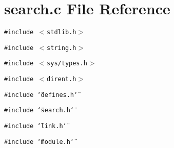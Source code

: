 \section{search.c File Reference}
\label{search_8c}
{\tt \#include $<$stdlib.h$>$}\par
{\tt \#include $<$string.h$>$}\par
{\tt \#include $<$sys/types.h$>$}\par
{\tt \#include $<$dirent.h$>$}\par
{\tt \#include \char`\"{}defines.h\char`\"{}}\par
{\tt \#include \char`\"{}search.h\char`\"{}}\par
{\tt \#include \char`\"{}link.h\char`\"{}}\par
{\tt \#include \char`\"{}module.h\char`\"{}}\par

